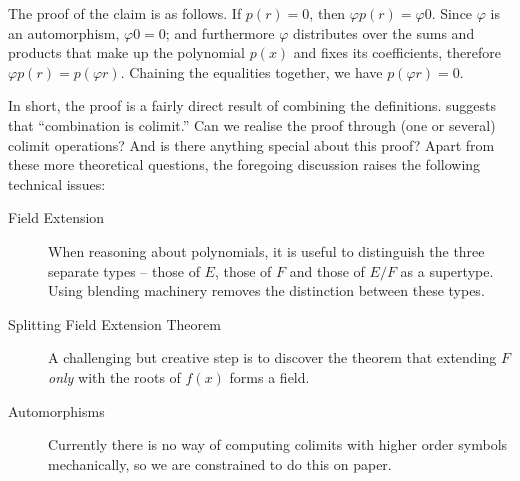 The proof of the claim is as follows.  If $p(r)=0$, then $\varphi
p(r)=\varphi 0$.  Since $\varphi$ is an automorphism, $\varphi 0 = 0$;
and furthermore $\varphi$ distributes over the sums and products that
make up the polynomial $p(x)$ and fixes its coefficients, therefore
$\varphi p(r)=p(\varphi r)$.  Chaining the equalities together, we
have $p(\varphi r)=0$.

In short, the proof is a fairly direct result of combining the
definitions.  \textcite{Goguen92sheafsemantics} suggests that
``combination is colimit.''  Can we realise the proof through (one or
several) colimit operations?  And is there anything special about this
proof?  Apart from these more theoretical questions, the foregoing
discussion raises the following technical issues:

\begin{description}
\item[Field Extension] When reasoning about polynomials, it is useful
  to distinguish the three separate types -- those of $E$, those of
  $F$ and those of $E/F$ as a supertype. Using blending machinery
  removes the distinction between these types.
\item[Splitting Field Extension Theorem] A challenging but creative
  step is to discover the theorem that extending $F$ {\em only} with
  the roots of $f(x)$ forms a field.
\item[Automorphisms] Currently there is no way of computing colimits
  with higher order symbols mechanically, so we are constrained to do
  this on paper.
\end{description}

% 

